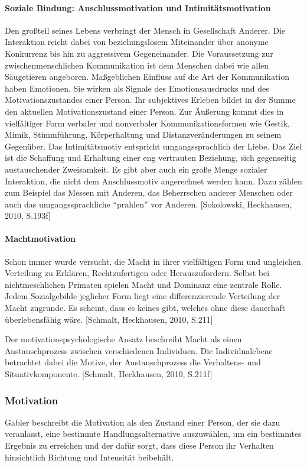 \paragraph{Soziale Bindung: Anschlussmotivation und Intimitätsmotivation} %
\label{ssub:markenaufbau_markenfuehrung}
Den großteil seines Lebens verbringt der Mensch in Gesellschaft Anderer. Die Interaktion reicht dabei von beziehungslosem Miteinander über anonyme Konkurrenz bis hin zu aggressivem Gegeneinander. Die Voraussetzung zur zwischenmenschlichen Kommunikation ist dem Menschen dabei wie allen Säugetieren angeboren. Maßgeblichen Einfluss auf die Art der Kommunikation haben Emotionen. Sie wirken als Signale des Emotionsausdrucks und des Motivationszustandes einer Person. Ihr subjektives Erleben bildet in der Summe den aktuellen Motivationszustand einer Person. Zur Äußerung kommt dies in vielfältiger Form verbaler und nonverbaler Kommunikationsformen wie Gestik, Mimik, Stimmführung, Körperhaltung und Distanzveränderungen zu seinem Gegenüber.
Das Intimitätsmotiv entspricht umgangssprachlich der \glqq Liebe\grqq. Das Ziel ist die Schaffung und Erhaltung einer eng vertrauten Beziehung, sich gegenseitig austauschender Zweisamkeit.
Es gibt aber auch ein große Menge sozialer Interaktion, die nicht dem Anschlussmotiv angerechnet werden kann. Dazu zählen zum Beispiel das Messen mit Anderen, das Beherrschen anderer Menschen oder auch das umgangssprachliche “prahlen” vor Anderen. [Sokolowski, Heckhausen, 2010, S.193f]

\paragraph{Machtmotivation} %
Schon immer wurde versucht, die Macht in ihrer vielfältigen Form und ungleichen Verteilung zu Erklären, Rechtzufertigen oder Herauszufordern. Selbst bei nichtmeschlichen Primaten spielen Macht und Dominanz eine zentrale Rolle. Jedem Sozialgebilde jeglicher Form liegt eine differenzierende Verteilung der Macht zugrunde. Es scheint, dass es keines gibt, welches ohne diese dauerhaft überlebensfähig wäre. [Schmalt, Heckhausen, 2010, S.211]

Der motivationspsychologische Ansatz beschreibt Macht als einen Austauschprozess zwischen verschiedenen Individuen. Die Individualebene betrachtet dabei die Motive, der Austauschprozess die Verhaltens- und Situativkomponente. [Schmalt, Heckhausen, 2010, S.211f]

\subsubsection{Motivation}
Gabler beschreibt die Motivation als den \glqq Zustand einer Person, der sie dazu veranlasst, eine bestimmte Handlungsalternative auszuwählen, um ein bestimmtes Ergebnis zu erreichen und der dafür sorgt, dass diese Person ihr Verhalten hinsichtlich Richtung und Intensität beibehält\grqq.

